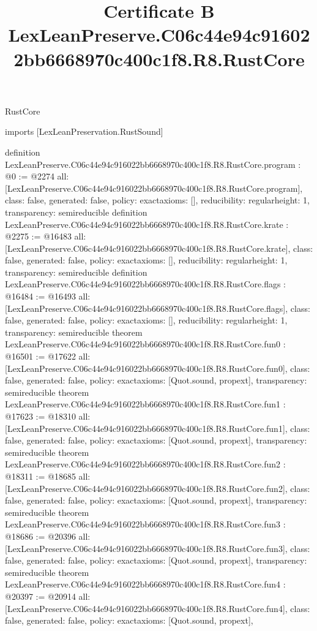 \begin{lexlean}{RustCore}
\title{Certificate B LexLeanPreserve.C06c44e94c916022bb6668970c400c1f8.R8.RustCore}
\begin{coremodule}
imports [LexLeanPreservation.RustSound]

definition LexLeanPreserve.C06c44e94c916022bb6668970c400c1f8.R8.RustCore.program : @0 := @2274 {
  all: [LexLeanPreserve.C06c44e94c916022bb6668970c400c1f8.R8.RustCore.program],
  class: false,
  generated: false,
  policy: exact{axioms: []},
  reducibility: regular{height: 1},
  transparency: semireducible
}
definition LexLeanPreserve.C06c44e94c916022bb6668970c400c1f8.R8.RustCore.krate : @2275 := @16483 {
  all: [LexLeanPreserve.C06c44e94c916022bb6668970c400c1f8.R8.RustCore.krate],
  class: false,
  generated: false,
  policy: exact{axioms: []},
  reducibility: regular{height: 1},
  transparency: semireducible
}
definition LexLeanPreserve.C06c44e94c916022bb6668970c400c1f8.R8.RustCore.flags : @16484 := @16493 {
  all: [LexLeanPreserve.C06c44e94c916022bb6668970c400c1f8.R8.RustCore.flags],
  class: false,
  generated: false,
  policy: exact{axioms: []},
  reducibility: regular{height: 1},
  transparency: semireducible
}
theorem LexLeanPreserve.C06c44e94c916022bb6668970c400c1f8.R8.RustCore.fun0 : @16501 := @17622 {
  all: [LexLeanPreserve.C06c44e94c916022bb6668970c400c1f8.R8.RustCore.fun0],
  class: false,
  generated: false,
  policy: exact{axioms: [Quot.sound, propext]},
  transparency: semireducible
}
theorem LexLeanPreserve.C06c44e94c916022bb6668970c400c1f8.R8.RustCore.fun1 : @17623 := @18310 {
  all: [LexLeanPreserve.C06c44e94c916022bb6668970c400c1f8.R8.RustCore.fun1],
  class: false,
  generated: false,
  policy: exact{axioms: [Quot.sound, propext]},
  transparency: semireducible
}
theorem LexLeanPreserve.C06c44e94c916022bb6668970c400c1f8.R8.RustCore.fun2 : @18311 := @18685 {
  all: [LexLeanPreserve.C06c44e94c916022bb6668970c400c1f8.R8.RustCore.fun2],
  class: false,
  generated: false,
  policy: exact{axioms: [Quot.sound, propext]},
  transparency: semireducible
}
theorem LexLeanPreserve.C06c44e94c916022bb6668970c400c1f8.R8.RustCore.fun3 : @18686 := @20396 {
  all: [LexLeanPreserve.C06c44e94c916022bb6668970c400c1f8.R8.RustCore.fun3],
  class: false,
  generated: false,
  policy: exact{axioms: [Quot.sound, propext]},
  transparency: semireducible
}
theorem LexLeanPreserve.C06c44e94c916022bb6668970c400c1f8.R8.RustCore.fun4 : @20397 := @20914 {
  all: [LexLeanPreserve.C06c44e94c916022bb6668970c400c1f8.R8.RustCore.fun4],
  class: false,
  generated: false,
  policy: exact{axioms: [Quot.sound, propext]},
}
\end{coremodule}
\end{lexlean}
